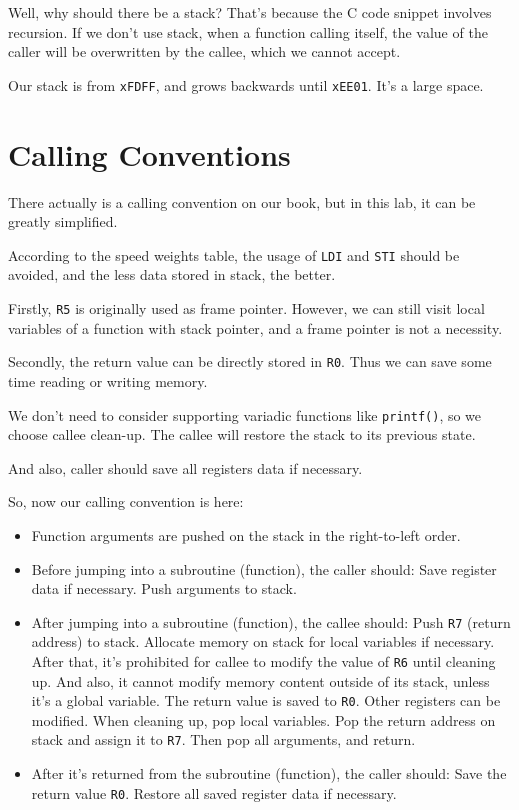 \documentclass{article}
\begin{document}
	Well, why should there be a stack? That's because the C code snippet involves recursion. If we don't use stack, when a function calling itself, the value of the caller will be overwritten by the callee, which we cannot accept.
	
	Our stack is from \texttt{xFDFF}, and grows backwards until \texttt{xEE01}. It's a large space.
	
	\section{Calling Conventions}
	
	There actually is a calling convention on our book\cite[Chapter~14]{ics}, but in this lab, it can be greatly simplified.
	
	According to the speed weights table, the usage of \texttt{LDI} and \texttt{STI} should be avoided, and the less data stored in stack, the better.
	
	Firstly, \texttt{R5} is originally used as frame pointer. However, we can still visit local variables of a function with stack pointer, and a frame pointer is not a necessity. 
	
	Secondly, the return value can be directly stored in \texttt{R0}. Thus we can save some time reading or writing memory.
	
	We don't need to consider supporting variadic functions like \texttt{printf()}, so we choose callee clean-up. The callee will restore the stack to its previous state.
	
	And also, caller should save all registers data if necessary.
	
	So, now our calling convention is here:
	
	\begin{itemize}
	\item Function arguments are pushed on the stack in the right-to-left order.
	\item Before jumping into a subroutine (function), the caller should:
	\subitem Save register data if necessary.
	\subitem Push arguments to stack.
	\item After jumping into a subroutine (function), the callee should:
	\subitem Push \texttt{R7} (return address) to stack.
	\subitem Allocate memory on stack for local variables if necessary.
	\subitem After that, it's prohibited for callee to modify the value of \texttt{R6} until cleaning up. And also, it cannot modify memory content outside of its stack, unless it's a global variable.
	\subitem The return value is saved to \texttt{R0}. Other registers can be modified.
	\subitem When cleaning up, pop local variables. Pop the return address on stack and assign it to \texttt{R7}. Then pop all arguments, and return.
	\item After it's returned from the subroutine (function), the caller should:
	\subitem Save the return value \texttt{R0}.
	\subitem Restore all saved register data if necessary.
	\end{itemize}
\end{document}
